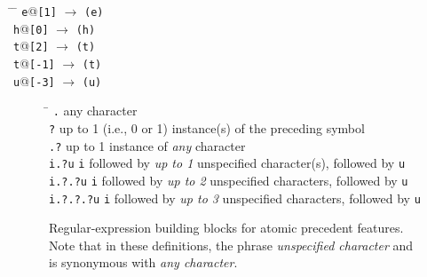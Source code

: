 {\begin{exe}
\ex 
\begin{xlist}
\begin{tabbing}
\hspace{0.7in} \= \hspace{0.5in} \=  \hspace{4.5in} \kill
 \texttt{e}\textrm{@}\texttt{[1]} \> $\to$ \>   \texttt{(e)} \\
 \texttt{h}\textrm{@}\texttt{[0]}  \>$\to$ \>     \texttt{(h)} \\
 \texttt{t}\textrm{@}\texttt{[2]}  \> $\to$   \>       \texttt{(t)} \\
 \texttt{t}@\texttt{[-1]}  \>  $\to$   \>    \texttt{(t)} \\
 \texttt{u}\textrm{@}\texttt{[-3]} \>   $\to$   \>   \texttt{(u)} \\
\end{tabbing}
\end{xlist}
\label{ex:positional-morphs}
\end{exe}

\begin{figure}[t]
\begin{mdframed}
\begin{tabbing}
 \hspace{1in}  \=  \hspace{5.5in} \kill
\texttt{.} \> any character\\
\texttt{?} \> up to 1 (i.e., 0 or 1) instance(s) of the preceding symbol \\
\texttt{.?} \> up to 1 instance of \emph{any} character\\
\texttt{i.?u}  \>\texttt{i} followed by \emph{up to 1} unspecified character(s), followed by \texttt{u}\\
\texttt{i.?.?u}  \>\texttt{i} followed by \emph{up to 2} unspecified characters, followed by \texttt{u}\\
\texttt{i.?.?.?u}  \>\texttt{i} followed by \emph{up to 3} unspecified characters, followed by \texttt{u}\\
\end{tabbing}
\caption{Regular-expression building blocks for atomic precedent features. Note that in these definitions, the phrase \emph{unspecified character} %
and is synonymous with \emph{any character}. }
\end{mdframed}
\label{fig:regex-defs}
\end{figure}

}
